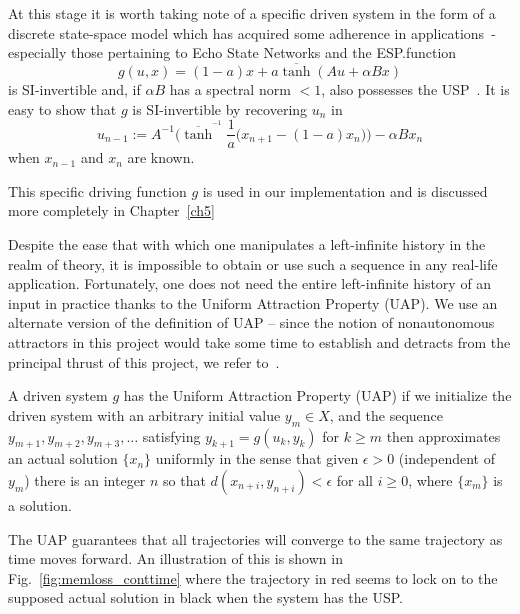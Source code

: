 At this stage it is worth taking note of a specific driven system in the form of a discrete state-space model which has acquired some adherence in applications~\cite{Manju_IEEE}- especially those pertaining to Echo State Networks and the ESP.\@The function 
\begin{equation}  \label{eqn_driving}
  g(u,x) = (1-a)x + a\overline{\tanh}(Au + \alpha Bx)
\end{equation} 
is SI-invertible and, if $\alpha B$ has a spectral norm $<1$, also possesses the USP~\cite[Th.2]{manjunath2013echo }. 
It is easy to show that $g$ is SI-invertible by recovering $u_n$ in 
\begin{equation} \label{eqn_SI_RNN}
  u_{n-1} := A^{-1}\bigg(\overline{\tanh}^{^{-1}}\frac{1}{a}\Big(x_{n+1}-(1-a)x_n\Big) \bigg) - \alpha B x_n
  \end{equation}
  when $x_{n-1}$ and $x_n$ are known.

This specific driving function $g$ is used in our implementation and is discussed more completely in Chapter~\ref{ch5}

Despite the ease that with which one manipulates a left-infinite history in the realm of theory, it is impossible to obtain or use such a sequence in any real-life application.  
Fortunately, one does not need the entire left-infinite history of an input in practice thanks to the Uniform Attraction Property (UAP). 
We use an alternate version of the definition of UAP -- since the notion of nonautonomous attractors in this project would take some time to establish and detracts from the principal thrust of this project, we refer to~\cite{Manju_Nonlinearity}. 

\begin{Definition}
  \label{Dfn_UAP}\rm
  A driven system $g$ has the Uniform Attraction Property (UAP) if we initialize the driven system
with an arbitrary initial value $y_m \in X$, and the sequence $y_{m+1}, y_{m+2}, y_{m+3},\ldots$ satisfying $y_{k+1}= g(u_k,y_k)$ for $k \geq m$ then approximates an actual solution $\{x_n\}$ uniformly in the sense that given $\epsilon>0$ (independent of $y_m$) there is an integer $n$ so that $d(x_{n+i}, y_{n+i})<\epsilon$ for all $i\ge 0$, where $\{x_m\}$ is a solution.
\end{Definition}

The UAP guarantees that all trajectories will converge to the same trajectory as time moves forward. 
An illustration of this is shown in Fig.~\ref{fig:memloss_conttime} where the trajectory in red seems to lock on to the supposed actual solution in black when the system has the USP.

